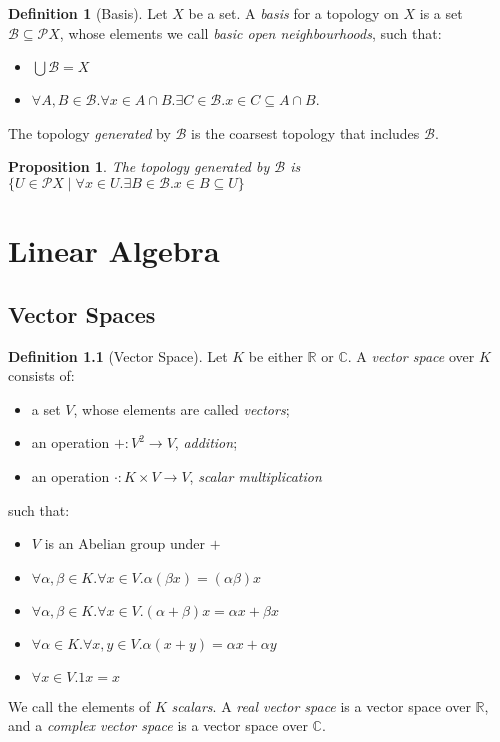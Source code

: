 \documentclass{book}
\newtheorem{prop}[ax]{Proposition}
\theoremstyle{definition}
\newtheorem{df}[ax]{Definition}
\begin{document}
\begin{df}[Basis]
Let $X$ be a set. A \emph{basis} for a topology on $X$ is a set $\mathcal{B} \subseteq \mathcal{P} X$, whose elements we call \emph{basic open neighbourhoods}, such that:
\begin{itemize}
\item $\bigcup \mathcal{B} = X$
\item $\forall A,B \in \mathcal{B}. \forall x \in A \cap B. \exists C \in \mathcal{B}. x \in C \subseteq A \cap B$.
\end{itemize}
The topology \emph{generated} by $\mathcal{B}$ is the coarsest topology that includes $\mathcal{B}$.
\end{df}

\begin{prop}
The topology generated by $\mathcal{B}$ is $\{ U \in \mathcal{P} X \mid \forall x \in U. \exists B \in \mathcal{B}. x \in B \subseteq U \}$
\end{prop}

\chapter{Linear Algebra}

\section{Vector Spaces}

\begin{df}[Vector Space]
Let $K$ be either $\mathbb{R}$ or $\mathbb{C}$. A \emph{vector space} over $K$ consists of:
\begin{itemize}
\item a set $V$, whose elements are called \emph{vectors};
\item an operation $+ : V^2 \rightarrow V$, \emph{addition};
\item an operation $\cdot : K \times V \rightarrow V$, \emph{scalar multiplication}
\end{itemize}
such that:
\begin{itemize}
\item $V$ is an Abelian group under $+$
\item $\forall \alpha, \beta \in K. \forall x \in V. \alpha (\beta x) = (\alpha \beta) x$
\item $\forall \alpha, \beta \in K. \forall x \in V. (\alpha + \beta) x = \alpha x + \beta x$
\item $\forall \alpha \in K. \forall x,y \in V. \alpha (x + y) = \alpha x + \alpha y$
\item $\forall x \in V. 1x = x$
\end{itemize}

We call the elements of $K$ \emph{scalars}. A \emph{real vector space} is a vector space over $\mathbb{R}$, and a \emph{complex vector space} is a vector space over $\mathbb{C}$.
\end{df}
\end{document}

